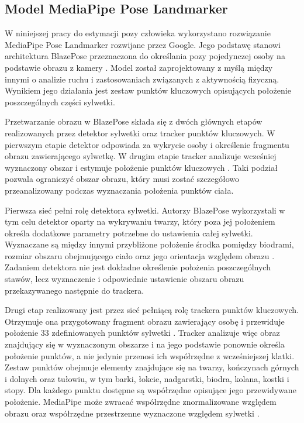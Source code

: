 \subsection{Model MediaPipe Pose Landmarker}

W niniejszej pracy do estymacji pozy człowieka wykorzystano rozwiązanie MediaPipe Pose Landmarker rozwijane przez Google. Jego podstawę stanowi architektura BlazePose przeznaczona do określania pozy pojedynczej osoby na podstawie obrazu z kamery \cite{bazarevsky2020blazepose,mediapipe_pose_landmarker}. Model został zaprojektowany z myślą między innymi o analizie ruchu i zastosowaniach związanych z aktywnością fizyczną. Wynikiem jego działania jest zestaw punktów kluczowych opisujących położenie poszczególnych części sylwetki.

Przetwarzanie obrazu w BlazePose składa się z dwóch głównych etapów realizowanych przez detektor sylwetki oraz tracker punktów kluczowych. W pierwszym etapie detektor odpowiada za wykrycie osoby i określenie fragmentu obrazu zawierającego sylwetkę. W drugim etapie tracker analizuje wcześniej wyznaczony obszar i estymuje położenie punktów kluczowych \cite{bazarevsky2020blazepose}. Taki podział pozwala ograniczyć obszar obrazu, który musi zostać szczegółowo przeanalizowany podczas wyznaczania położenia punktów ciała.

Pierwsza sieć pełni rolę detektora sylwetki. Autorzy BlazePose wykorzystali w tym celu detektor oparty na wykrywaniu twarzy, który poza jej położeniem określa dodatkowe parametry potrzebne do ustawienia całej sylwetki. Wyznaczane są między innymi przybliżone położenie środka pomiędzy biodrami, rozmiar obszaru obejmującego ciało oraz jego orientacja względem obrazu \cite{bazarevsky2020blazepose}. Zadaniem detektora nie jest dokładne określenie położenia poszczególnych stawów, lecz wyznaczenie i odpowiednie ustawienie obszaru obrazu przekazywanego następnie do trackera.

Drugi etap realizowany jest przez sieć pełniącą rolę trackera punktów kluczowych. Otrzymuje ona przygotowany fragment obrazu zawierający osobę i przewiduje położenie 33 zdefiniowanych punktów sylwetki \cite{bazarevsky2020blazepose,mediapipe_pose_docs}. Tracker analizuje więc obraz znajdujący się w wyznaczonym obszarze i na jego podstawie ponownie określa położenie punktów, a nie jedynie przenosi ich współrzędne z wcześniejszej klatki. Zestaw punktów obejmuje elementy znajdujące się na twarzy, kończynach górnych i dolnych oraz tułowiu, w tym barki, łokcie, nadgarstki, biodra, kolana, kostki i stopy. Dla każdego punktu dostępne są współrzędne opisujące jego przewidywane położenie. MediaPipe może zwracać współrzędne znormalizowane względem obrazu oraz współrzędne przestrzenne wyznaczone względem sylwetki \cite{mediapipe_pose_landmarker}.

